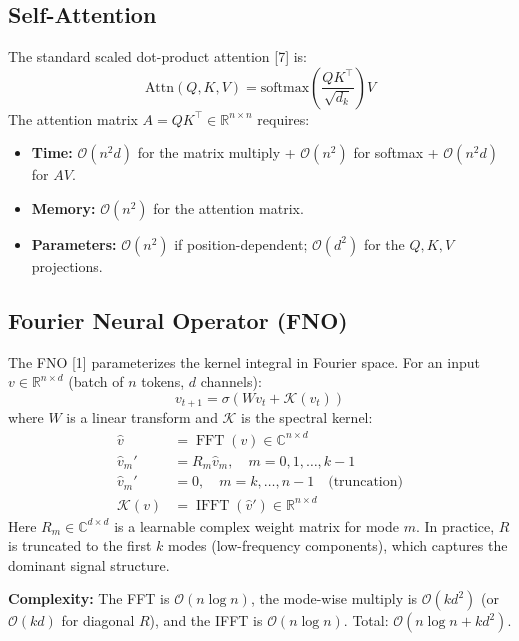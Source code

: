 \documentclass[11pt,a4paper]{article}
\theoremstyle{definition}
\theoremstyle{remark}
\newcommand{\R}{\mathbb{R}}
\newcommand{\C}{\mathbb{C}}
\newcommand{\FFT}{\operatorname{FFT}}
\newcommand{\IFFT}{\operatorname{IFFT}}
\newcommand{\bigO}{\mathcal{O}}
\begin{document}
\subsection{Self-Attention}

The standard scaled dot-product attention [7] is:
\begin{equation}
  \text{Attn}(Q,K,V) = \text{softmax}\!\left(\frac{QK^\top}{\sqrt{d_k}}\right) V
\end{equation}
The attention matrix $A = QK^\top \in \R^{n \times n}$ requires:
\begin{itemize}[noitemsep]
  \item \textbf{Time:} $\bigO(n^2 d)$ for the matrix multiply + $\bigO(n^2)$ for
    softmax + $\bigO(n^2 d)$ for $AV$.
  \item \textbf{Memory:} $\bigO(n^2)$ for the attention matrix.
  \item \textbf{Parameters:} $\bigO(n^2)$ if position-dependent; $\bigO(d^2)$
    for the $Q,K,V$ projections.
\end{itemize}

\subsection{Fourier Neural Operator (FNO)}

The FNO [1] parameterizes the kernel integral in Fourier space. For
an input $v \in \R^{n \times d}$ (batch of $n$ tokens, $d$ channels):
\begin{equation}
  v_{t+1} = \sigma\!\left( W v_t + \mathcal{K}(v_t) \right)
  \label{eq:fno}
\end{equation}
where $W$ is a linear transform and $\mathcal{K}$ is the spectral kernel:
\begin{align}
  \hat{v} &= \FFT(v) \in \C^{n \times d} \\
  \hat{v}_m' &= R_m \hat{v}_m, \quad m = 0, 1, \ldots, k-1 \\
  \hat{v}_m' &= 0, \quad m = k, \ldots, n-1 \quad \text{(truncation)} \\
  \mathcal{K}(v) &= \IFFT(\hat{v}') \in \R^{n \times d}
\end{align}
Here $R_m \in \C^{d \times d}$ is a learnable complex weight matrix for mode $m$.
In practice, $R$ is truncated to the first $k$ modes (low-frequency components),
which captures the dominant signal structure.

\textbf{Complexity:} The FFT is $\bigO(n \log n)$, the mode-wise multiply is
$\bigO(k d^2)$ (or $\bigO(k d)$ for diagonal $R$), and the IFFT is $\bigO(n \log n)$.
Total: $\bigO(n \log n + k d^2)$.
\end{document}
